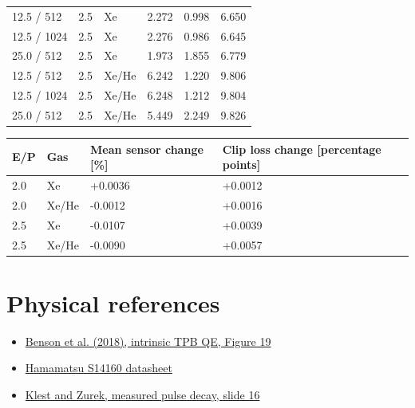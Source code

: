 \documentclass{article}
\begin{document}
\begin{center}
\begin{tabular}{llllll}
12.5 / 512 & 2.5 & Xe & 2.272 & 0.998 & 6.650\\
12.5 / 1024 & 2.5 & Xe & 2.276 & 0.986 & 6.645\\
25.0 / 512 & 2.5 & Xe & 1.973 & 1.855 & 6.779\\
12.5 / 512 & 2.5 & Xe/He & 6.242 & 1.220 & 9.806\\
12.5 / 1024 & 2.5 & Xe/He & 6.248 & 1.212 & 9.804\\
25.0 / 512 & 2.5 & Xe/He & 5.449 & 2.249 & 9.826\\
\bottomrule\end{tabular}\end{center}\begin{center}\small\begin{tabular}{llll}\toprule
E/P & Gas & Mean sensor change [\%] & Clip loss change [percentage points]\\\midrule
2.0 & Xe & +0.0036 & +0.0012\\
2.0 & Xe/He & -0.0012 & +0.0016\\
2.5 & Xe & -0.0107 & +0.0039\\
2.5 & Xe/He & -0.0090 & +0.0057\\
\bottomrule\end{tabular}\end{center}\section*{Physical references}
\begin{itemize}
\item \href{https://doi.org/10.1140/epjc/s10052-018-5807-z}{Benson et al. (2018), intrinsic TPB QE, Figure 19}
\item \href{https://www.hamamatsu.com/content/dam/hamamatsu-photonics/sites/documents/99_SALES_LIBRARY/ssd/s14160-1310ps_etc_kapd1070e.pdf}{Hamamatsu S14160 datasheet}
\item \href{https://indico.bnl.gov/event/20473/contributions/84622/attachments/51960/88885/BIC%2520SiPM%2520Choice%2520Intro.pdf}{Klest and Zurek, measured pulse decay, slide 16}\end{itemize}\end{document}
\end{document}
